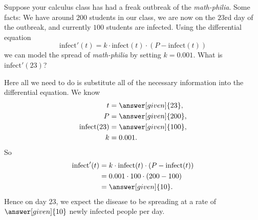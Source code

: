 \documentclass{ximera}
\begin{document}
\begin{example}
  Suppose your calculus class has had a freak outbreak of the
  \textit{math-philia}. Some facts: We have around $200$ students in
  our class, we are now on the $23$rd day of the outbreak, and
  currently $100$ students are infected. Using the differential
  equation
  \[
  \mathrm{infect}'(t) = k\cdot \mathrm{infect}(t)\cdot (P-\mathrm{infect}(t))
  \]
  we can model the spread of \textit{math-philia} by setting $k=0.001$.
  What is $\mathrm{infect}'(23)$?

  \begin{explanation}
    Here all we need to do is substitute all of the necessary
    information into the differential equation. We know
    \begin{align*}
    t &= \answer[given]{23},\\
    P &= \answer[given]{200},\\
    \mathrm{infect}(23) &= \answer[given]{100},\\
    k&= 0.001.
    \end{align*}
    So
    \begin{align*}
      \mathrm{infect}'(t) &= k\cdot \mathrm{infect}(t)\cdot (P-\mathrm{infect}(t))\\
      &= 0.001\cdot 100\cdot(200-100)\\
      &=\answer[given]{10}.
    \end{align*}
    Hence on day $23$, we expect the disease to be spreading at a rate
    of $\answer[given]{10}$ newly infected people per day.
  \end{explanation}
\end{example}


\end{document}
